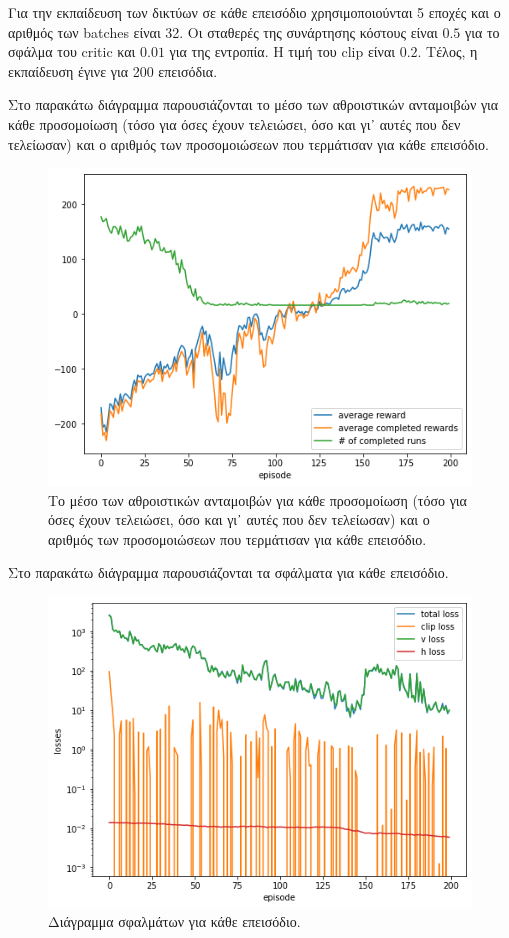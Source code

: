 \documentclass[a4paper]{article}
\begin{document}
Για την εκπαίδευση των δικτύων σε κάθε επεισόδιο χρησιμοποιούνται 5 εποχές και ο
αριθμός των batches είναι 32. Οι σταθερές της συνάρτησης κόστους είναι $0.5$ για
το σφάλμα του critic και $0.01$ για της εντροπία. Η τιμή του clip είναι $0.2$.
Τέλος, η εκπαίδευση έγινε για 200 επεισόδια.

Στο παρακάτω διάγραμμα παρουσιάζονται το μέσο των αθροιστικών ανταμοιβών για
κάθε προσομοίωση (τόσο για όσες έχουν τελειώσει, όσο και γι᾽ αυτές που δεν
τελείωσαν) και ο αριθμός των προσομοιώσεων που τερμάτισαν για κάθε επεισόδιο.

\begin{figure}[H]
    \centering

    \includegraphics[width=.8\linewidth]{ppo_rewards.png}

    \caption{Το μέσο των αθροιστικών ανταμοιβών για κάθε προσομοίωση (τόσο για
    όσες έχουν τελειώσει, όσο και γι᾽ αυτές που δεν τελείωσαν) και ο αριθμός των
    προσομοιώσεων που τερμάτισαν για κάθε επεισόδιο.}
\end{figure}

Στο παρακάτω διάγραμμα παρουσιάζονται τα σφάλματα για κάθε επεισόδιο.

\begin{figure}[H]
    \centering

    \includegraphics[width=.8\linewidth]{ppo_losses.png}

    \caption{Διάγραμμα σφαλμάτων για κάθε επεισόδιο.}
\end{figure}
\end{document}
